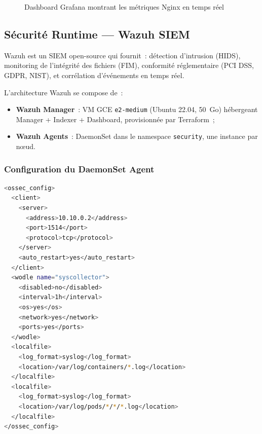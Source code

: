 \begin{figure}[H]
    \centering
    \caption{Dashboard Grafana montrant les métriques Nginx en temps réel}
    \label{fig:grafana_dashboard}
\end{figure}

\subsection{Sécurité Runtime --- Wazuh SIEM}

Wazuh est un SIEM open-source qui fournit~: détection d'intrusion (HIDS), monitoring de
l'intégrité des fichiers (FIM), conformité réglementaire (PCI DSS, GDPR, NIST), et
corrélation d'événements en temps réel.

L'architecture Wazuh se compose de~:
\begin{itemize}
  \item \textbf{Wazuh Manager}~: VM GCE \texttt{e2-medium} (Ubuntu 22.04, 50~Go) hébergeant
        Manager + Indexer + Dashboard, provisionnée par Terraform~;
  \item \textbf{Wazuh Agents}~: DaemonSet dans le namespace \texttt{security},
        une instance par nœud.
\end{itemize}

\subsubsection{Configuration du DaemonSet Agent}

\begin{lstlisting}[language=bash, caption=Configuration Wazuh Agent (ossec.conf)]
<ossec_config>
  <client>
    <server>
      <address>10.10.0.2</address>
      <port>1514</port>
      <protocol>tcp</protocol>
    </server>
    <auto_restart>yes</auto_restart>
  </client>
  <wodle name="syscollector">
    <disabled>no</disabled>
    <interval>1h</interval>
    <os>yes</os>
    <network>yes</network>
    <ports>yes</ports>
  </wodle>
  <localfile>
    <log_format>syslog</log_format>
    <location>/var/log/containers/*.log</location>
  </localfile>
  <localfile>
    <log_format>syslog</log_format>
    <location>/var/log/pods/*/*/*.log</location>
  </localfile>
</ossec_config>
\end{lstlisting}

